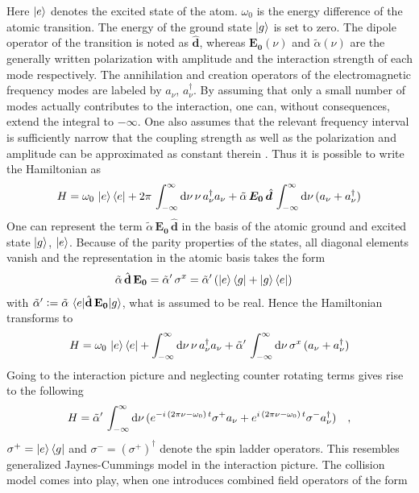 Here $\ket{e}$ denotes the excited state of the atom. $\omega_0$ is the energy difference of the atomic transition. The energy of the ground state $\ket{g}$ is set to zero. The dipole operator of the transition is noted as $\hat{\mathbf{d}}$, whereas $\mathbf{E_0}(\nu)$ and $\tilde{\alpha}(\nu)$ are the generally written polarization with amplitude and the interaction strength of each mode respectively. The annihilation and creation operators of the electromagnetic frequency modes are labeled by $a_\nu$, $a_\nu^\dagger$. By assuming that only a small number of modes actually contributes to the interaction, one can, without consequences, extend the integral to $-\infty$. One also assumes that the relevant frequency interval is sufficiently narrow that the coupling strength as well as the polarization and amplitude can be approximated as constant therein \cite{ciccarello_quantum_2022,gross_qubit_2018}. Thus it is possible to write the Hamiltonian as
\begin{align*}
    H= {\omega_0}\,\ket{e}\bra{e}+2\pi\,\int_{-\infty}^\infty\text{d}\nu\,\nu\,a^\dagger_\nu a_\nu+ \tilde{\alpha}\,\boldsymbol{E_0}\,\hat{\boldsymbol{d}}\,\int_{-\infty}^\infty\text{d}\nu\,(a_\nu+a^\dagger_\nu)
\end{align*}
One can represent the term $\tilde{\alpha}\,\mathbf{E_0}\,\hat{\mathbf{d}}$ in the basis of the atomic ground and excited state $\ket{g}$, $\ket{e}$. Because of the parity properties of the states, all diagonal elements vanish and the representation in the atomic basis takes the form
\begin{align*}
    \tilde{\alpha}\,\hat{\mathbf{d}}\,\mathbf{E_0}&= \tilde{\alpha}'\,\sigma^x=\tilde{\alpha}'\,(\ket{e}\bra{g}+\ket{g}\bra{e})
\end{align*}
with $\tilde{\alpha}'\vcentcolon=\tilde{\alpha}\,\braket{e|\hat{\mathbf{d}}\,\mathbf{E_0}|g}$, what is assumed to be real. Hence the Hamiltonian transforms to
\begin{align*}
    H= {\omega_0}\,\ket{e}\bra{e}+\int_{-\infty}^\infty\text{d}\nu\,\nu\,a^\dagger_\nu a_\nu+ \tilde{\alpha}'\,\int_{-\infty}^\infty\text{d}\nu\,\sigma^x\,(a_\nu+a^\dagger_\nu)
\end{align*}
Going to the interaction picture and neglecting counter rotating terms gives rise to the following
\begin{align*}
    H=\tilde{\alpha}'\,\int_{-\infty}^\infty\text{d}\nu\,(e^{-i\,(2\pi\nu-\omega_0)\, t}\sigma^+a_\nu+e^{i\,(2\pi\nu-\omega_0)\, t}\sigma^-a^\dagger_\nu)\quad,
\end{align*}
$\sigma^+=\ket{e}\bra{g}$ and $\sigma^-=(\sigma^+)^\dagger$ denote the spin ladder operators. This resembles generalized Jaynes-Cummings model in the interaction picture. The collision model comes into play, when one introduces combined field operators of the form
